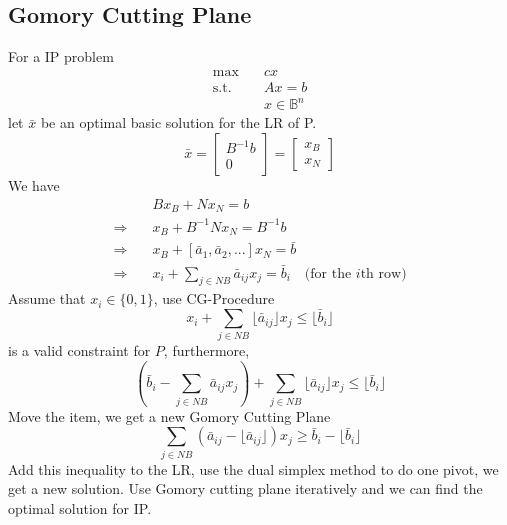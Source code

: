 				\subsection{Gomory Cutting Plane}
					For a IP problem
					\begin{align}
						\max \quad & cx  \\
						\text{s.t.} \quad & Ax=b  \\
							& x \in \mathbb{B}^n 
					\end{align}
					let $\bar{x}$ be an optimal basic solution for the LR of P.
					\begin{equation}
						\bar{x} = \left[\begin{matrix} B^{-1}b \\ 0 \end{matrix}\right] = \left[ \begin{matrix}x_B \\ x_N\end{matrix}\right] 
					\end{equation}
					We have
					\begin{align}
						& Bx_B + Nx_N = b \\
						\Rightarrow \quad & x_B + B^{-1}Nx_N=B^{-1}b  \\
						\Rightarrow \quad & x_B + [\bar{a}_1, \bar{a}_2, ...]x_N = \bar{b} \\
						\Rightarrow \quad & x_i + \sum_{j\in NB} \bar{a}_{ij}x_j = \bar{b}_i \quad \text{(for the $i$th row)} 
					\end{align}
					Assume that $x_i \in \{0, 1\}$, use CG-Procedure
					\begin{equation}
						x_i + \sum_{j \in NB} \lfloor \bar{a}_{ij} \rfloor x_j \le \lfloor \bar{b}_i \rfloor 
					\end{equation}
					is a valid constraint for $P$, furthermore,
					\begin{equation}
						(\bar{b}_i - \sum_{j\in NB} \bar{a}_{ij}x_j) + \sum_{j\in NB}\lfloor \bar{a}_{ij} \rfloor x_j\le \lfloor \bar{b}_i \rfloor 
					\end{equation}
					Move the item, we get a new Gomory Cutting Plane
					\begin{equation}
						\sum_{j\in NB} (\bar{a}_{ij} - \lfloor \bar{a}_{ij} \rfloor)x_j \ge \bar{b}_i - \lfloor \bar{b}_i \rfloor  
					\end{equation}
					Add this inequality to the LR, use the dual simplex method to do one pivot, we get a new solution. Use Gomory cutting plane iteratively and we can find the optimal solution for IP.

